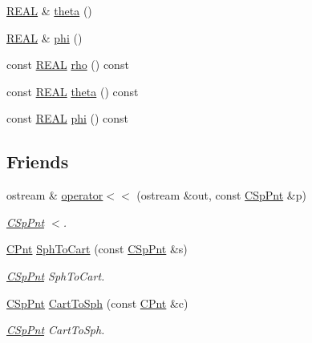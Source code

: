 \begin{DoxyCompactItemize}
\item 
\hyperlink{util_8h_a5821460e95a0800cf9f24c38915cbbde}{R\-E\-A\-L} \& \hyperlink{classCSpPnt_a4b48e7760135fc768ab6911a328194ba}{theta} ()
\item 
\hyperlink{util_8h_a5821460e95a0800cf9f24c38915cbbde}{R\-E\-A\-L} \& \hyperlink{classCSpPnt_af4f411d4a656dfec7c5a69ba065dbe1d}{phi} ()
\item 
const \hyperlink{util_8h_a5821460e95a0800cf9f24c38915cbbde}{R\-E\-A\-L} \hyperlink{classCSpPnt_ad7366f49f0fde0b19a3682ace6b606ba}{rho} () const 
\item 
const \hyperlink{util_8h_a5821460e95a0800cf9f24c38915cbbde}{R\-E\-A\-L} \hyperlink{classCSpPnt_aed72be0c307a800a1b7565ba80d87e1f}{theta} () const 
\item 
const \hyperlink{util_8h_a5821460e95a0800cf9f24c38915cbbde}{R\-E\-A\-L} \hyperlink{classCSpPnt_a4ecdc3162c71e20aed001b40a497a339}{phi} () const 
\end{DoxyCompactItemize}
\subsection*{Friends}
\begin{DoxyCompactItemize}
\item 
ostream \& \hyperlink{classCSpPnt_a53a39a67bc3f52a606be1d4e71085b3f}{operator$<$$<$} (ostream \&out, const \hyperlink{classCSpPnt}{C\-Sp\-Pnt} \&p)
\begin{DoxyCompactList}\small\item\em \hyperlink{classCSpPnt}{C\-Sp\-Pnt} $<$. \end{DoxyCompactList}\item 
\hyperlink{classCPnt}{C\-Pnt} \hyperlink{classCSpPnt_af8b263bb80bb3a76271a7f57d5057df3}{Sph\-To\-Cart} (const \hyperlink{classCSpPnt}{C\-Sp\-Pnt} \&s)
\begin{DoxyCompactList}\small\item\em \hyperlink{classCSpPnt}{C\-Sp\-Pnt} Sph\-To\-Cart. \end{DoxyCompactList}\item 
\hyperlink{classCSpPnt}{C\-Sp\-Pnt} \hyperlink{classCSpPnt_ad05fbf75e7550a927bc817f97115f2fc}{Cart\-To\-Sph} (const \hyperlink{classCPnt}{C\-Pnt} \&c)
\begin{DoxyCompactList}\small\item\em \hyperlink{classCSpPnt}{C\-Sp\-Pnt} Cart\-To\-Sph. \end{DoxyCompactList}\end{DoxyCompactItemize}


